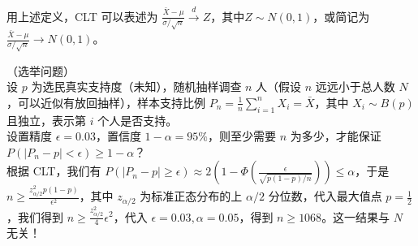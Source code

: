 \documentclass[../main.tex]{subfiles}
\begin{document}
用上述定义，CLT 可以表述为 $\frac{\bar X-\mu}{\sigma/\sqrt n}\overset{d}\rightarrow Z$，其中$Z\sim N(0,1)$，或简记为 $\frac{\bar X-\mu}{\sigma/\sqrt n}\rightarrow N(0,1)$。

\begin{example}
    （选举问题）\\
    设 $p$ 为选民真实支持度（未知），随机抽样调查 $n$ 人（假设 $n$ 远远小于总人数 $N$，可以近似有放回抽样），样本支持比例 $P_n=\frac1n\sum_{i=1}^nX_i=\bar X$，其中 $X_i\sim B(p)$ 且独立，表示第 $i$ 个人是否支持。\\
    设置精度 $\epsilon=0.03$，置信度 $1-\alpha=95\%$，则至少需要 $n$ 为多少，才能保证 $P(|P_n-p|<\epsilon)\geq1-\alpha$？\\
    根据 CLT，我们有 $P(|P_n-p|\geq\epsilon)\approx2\left(1-\Phi(\frac\epsilon{\sqrt{p(1-p)/n}})\right)\leq\alpha$，于是 $n\geq\frac{z_{\alpha/2}^2p(1-p)}{\epsilon^2}$，其中 $z_{\alpha/2}$ 为标准正态分布的上 $\alpha/2$ 分位数，代入最大值点 $p=\frac12$，我们得到 $n\geq\frac{z_{\alpha/2}^2}4\epsilon^2$，代入 $\epsilon=0.03,\alpha=0.05$，得到 $n\geq1068$。这一结果与 $N$ 无关！
\end{example}
\end{document}
